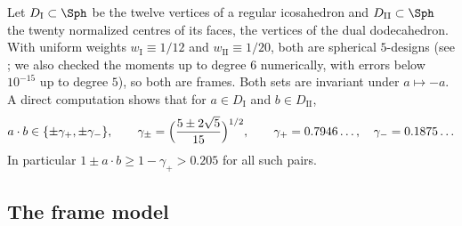 Let $D_{\mathrm I} \subset \Sph$ be the twelve vertices of a regular icosahedron and $D_{\mathrm{II}} \subset \Sph$ the twenty normalized centres of its faces, the vertices of the dual dodecahedron. With uniform weights $w_{\mathrm I} \equiv 1/12$ and $w_{\mathrm{II}} \equiv 1/20$, both are spherical $5$-designs (see \cite{DGS77}; we also checked the moments up to degree $6$ numerically, with errors below $10^{-15}$ up to degree $5$), so both are frames. Both sets are invariant under $a \mapsto -a$. A direct computation shows that for $a \in D_{\mathrm I}$ and $b \in D_{\mathrm{II}}$,
\begin{equation}\label{e:icodod}
a \cdot b \in \{ \pm \gamma_+, \pm \gamma_- \}, \qquad \gamma_\pm = \Bigl( \frac{5 \pm 2 \sqrt 5}{15} \Bigr)^{1/2}, \qquad \gamma_+ = 0.7946\ldots, \quad \gamma_- = 0.1875\ldots
\end{equation}
In particular $1 \pm a \cdot b \ge 1 - \gamma_+ > 0.205$ for all such pairs.

\subsection{The frame model}\label{s:framemodel}

